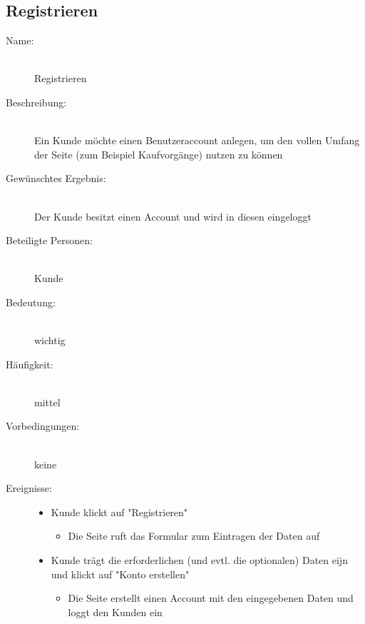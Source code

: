 \documentclass[a4paper]{article}
\begin{document}
\subsection{Registrieren}
\begin{description}
	\item[Name:]\hfill \\
	Registrieren
	\item[Beschreibung:]\hfill \\ 
	Ein Kunde möchte einen Benutzeraccount anlegen, um den vollen Umfang der Seite (zum Beispiel Kaufvorgänge) nutzen zu können
	\item[Gewünschtes Ergebnis:]\hfill \\ 
	Der Kunde besitzt einen Account und wird in diesen eingeloggt
	\item[Beteiligte Personen:]\hfill \\ 
	Kunde
	\item[Bedeutung:]\hfill \\ 
	wichtig
	\item[Häufigkeit:]\hfill \\ 
	mittel
	\item[Vorbedingungen:]\hfill \\ 
	keine
	\item[Ereignisse:]\hfill
	\begin{itemize}
		\item Kunde klickt auf "Registrieren"
		\begin{itemize}
			\item Die Seite ruft das Formular zum Eintragen der Daten auf
		\end{itemize}
		\item Kunde trägt die erforderlichen (und evtl. die optionalen) Daten eijn und klickt auf "Konto erstellen"
		\begin{itemize}
			\item Die Seite erstellt einen Account mit den eingegebenen Daten und loggt den Kunden ein
		\end{itemize}
	\end{itemize}
\end{description}
\end{document}
